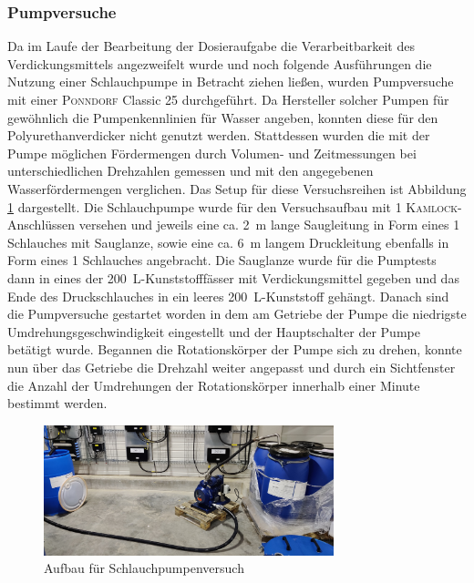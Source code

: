 \subsubsection{Pumpversuche}
Da im Laufe der Bearbeitung der Dosieraufgabe die Verarbeitbarkeit des Verdickungsmittels angezweifelt wurde und noch folgende Ausführungen die Nutzung einer Schlauchpumpe in Betracht ziehen ließen, wurden Pumpversuche mit einer \textsc{Ponndorf} Classic 25 durchgeführt. Da Hersteller solcher Pumpen für gewöhnlich die Pumpenkennlinien für Wasser angeben, konnten diese für den Polyurethanverdicker nicht genutzt werden. Stattdessen wurden die mit der Pumpe möglichen Fördermengen durch Volumen- und Zeitmessungen bei unterschiedlichen Drehzahlen gemessen und mit den angegebenen Wasserfördermengen verglichen.\linebreak
Das Setup für diese Versuchsreihen ist Abbildung \ref{fig:pumpentest} dargestellt.  Die Schlauchpumpe wurde für den Versuchsaufbau mit \SI{1}{\zoll} \textsc{Kamlock}-Anschlüssen versehen und jeweils eine ca. \SI{2}{\meter} lange Saugleitung in Form eines \SI{1}{\zoll} Schlauches mit Sauglanze, sowie eine ca. \SI{6}{\meter} langem Druckleitung ebenfalls in Form eines \SI{1}{\zoll} Schlauches angebracht. Die Sauglanze wurde für die Pumptests dann in eines der \SI{200}{\liter}-Kunststofffässer mit Verdickungsmittel gegeben und das Ende des Druckschlauches in ein leeres \SI{200}{\liter}-Kunststoff gehängt. Danach sind die Pumpversuche gestartet worden in dem am Getriebe der Pumpe die niedrigste Umdrehungsgeschwindigkeit eingestellt und der Hauptschalter der Pumpe betätigt wurde. Begannen die Rotationskörper der Pumpe sich zu drehen, konnte nun über das Getriebe die Drehzahl weiter angepasst und durch ein Sichtfenster die Anzahl der Umdrehungen der Rotationskörper innerhalb einer Minute bestimmt werden.

\begin{figure}[h!]
	\centering
	\includegraphics[width=0.75\textwidth]{img/pumpenversuch}
	\caption{Aufbau für Schlauchpumpenversuch}
	\label{fig:pumpentest}
\end{figure}
\FloatBarrier

